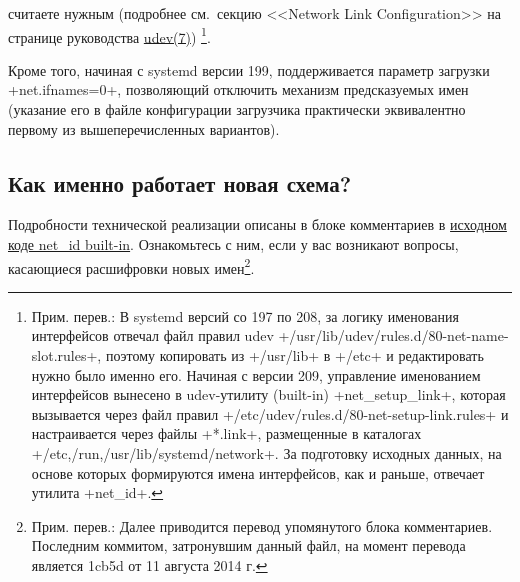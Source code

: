 \documentclass[10pt,oneside,a4paper]{article}
\begin{document}
\begin{enumerate}
		считаете нужным (подробнее см.~секцию <<Network Link
		Configuration>> на странице руководства
		\href{http://www.freedesktop.org/software/systemd/man/udev.html#Network%20Link%20Configuration}{udev(7)})%
		\footnote{Прим. перев.: В systemd версий со 197 по 208, за
		логику именования интерфейсов отвечал файл правил udev
		+/usr/lib/udev/rules.d/80-net-name-slot.rules+, поэтому
		копировать из +/usr/lib+ в +/etc+ и редактировать нужно было
		именно его. Начиная с версии 209, управление именованием
		интерфейсов вынесено в udev-утилиту (built-in) +net_setup_link+,
		которая вызывается через файл правил
		+/etc/udev/rules.d/80-net-setup-link.rules+ и настраивается
		через файлы +*.link+, размещенные в каталогах
		+{/etc,/run,/usr/lib}/systemd/network+. За подготовку исходных
		данных, на основе которых формируются имена интерфейсов, как и
		раньше, отвечает утилита +net_id+.}.
\end{enumerate}

Кроме того, начиная с systemd версии 199, поддерживается параметр загрузки
+net.ifnames=0+, позволяющий отключить механизм предсказуемых имен (указание его
в файле конфигурации загрузчика практически эквивалентно первому из
вышеперечисленных вариантов).

\subsection{Как именно работает новая схема?}

Подробности технической реализации описаны в блоке комментариев в
\href{http://cgit.freedesktop.org/systemd/systemd/tree/src/udev/udev-builtin-net_id.c#n20}%
{исходном коде net\_id built-in}. Ознакомьтесь с ним, если у вас возникают
вопросы, касающиеся расшифровки новых имен\footnote{Прим. перев.: Далее
приводится перевод упомянутого блока комментариев. Последним коммитом,
затронувшим данный файл, на момент перевода является 1cb5d от 11 августа
2014 г.}.
\end{document}

